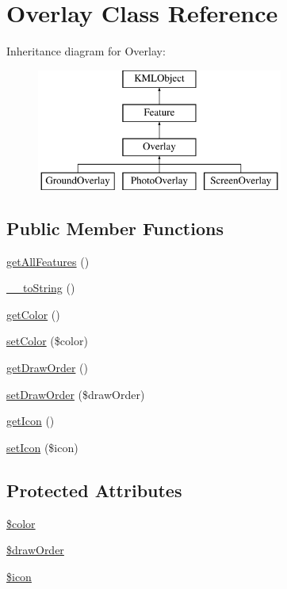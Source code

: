 \hypertarget{classOverlay}{
\section{Overlay Class Reference}
\label{d3/d05/classOverlay}
}
Inheritance diagram for Overlay:\begin{figure}[H]
\begin{center}
\leavevmode
\includegraphics[height=4.000000cm]{d3/d05/classOverlay}
\end{center}
\end{figure}
\subsection*{Public Member Functions}
\begin{DoxyCompactItemize}
\item 
\hyperlink{classOverlay_a4eb1a44212c4a806aeb330340e18b34d}{getAllFeatures} ()
\item 
\hyperlink{classOverlay_ac17d92076f83e40cb43ccd108e65533b}{\_\-\_\-toString} ()
\item 
\hyperlink{classOverlay_a115f11a5ead3e8e2e9a7e68f44ac776e}{getColor} ()
\item 
\hyperlink{classOverlay_ad60daaf68672a7d6009e56b175bbf1e2}{setColor} (\$color)
\item 
\hyperlink{classOverlay_a04ab334eedb372e43841af3f2273d47c}{getDrawOrder} ()
\item 
\hyperlink{classOverlay_a3ff9f2666da2a382a063e3a8ece909af}{setDrawOrder} (\$drawOrder)
\item 
\hyperlink{classOverlay_a1b060f6a3432f2075440163300086b35}{getIcon} ()
\item 
\hyperlink{classOverlay_ac57f26b6e53774a7b41ebf40f18ae6ba}{setIcon} (\$icon)
\end{DoxyCompactItemize}
\subsection*{Protected Attributes}
\begin{DoxyCompactItemize}
\item 
\hyperlink{classOverlay_a532fb4c7e06dada682bc0907df59b9c9}{\$color}
\item 
\hyperlink{classOverlay_ac28f33c36076ec5bd4f4726f4cafdbfa}{\$drawOrder}
\item 
\hyperlink{classOverlay_a5540a8d829324b8123a1712dc4984952}{\$icon}
\end{DoxyCompactItemize}


